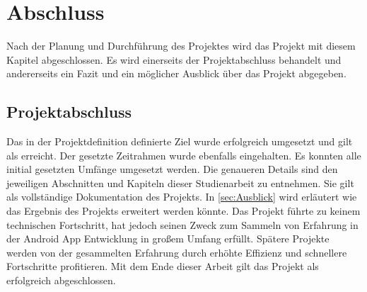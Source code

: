 \chapter{Abschluss}\label{chpt:schluss}
Nach der Planung und Durchführung des Projektes wird das Projekt mit diesem Kapitel abgeschlossen. Es wird einerseits der Projektabschluss behandelt und andererseits ein Fazit und ein möglicher Ausblick über das Projekt abgegeben.

\section{Projektabschluss}\label{sec:projektschluss}
Das in der Projektdefinition definierte Ziel wurde erfolgreich umgesetzt und gilt als erreicht. Der gesetzte Zeitrahmen wurde ebenfalls eingehalten. Es konnten alle initial gesetzten Umfänge umgesetzt werden. Die genaueren Details sind den jeweiligen Abschnitten und Kapiteln dieser Studienarbeit zu entnehmen. Sie gilt als vollständige Dokumentation des Projekts.
In \autoref{sec:Ausblick} wird erläutert wie das Ergebnis des Projekts erweitert werden könnte. Das Projekt führte zu keinem technischen Fortschritt, hat jedoch seinen Zweck zum Sammeln von Erfahrung in der Android App Entwicklung in großem Umfang erfüllt. Spätere Projekte werden von der gesammelten Erfahrung durch erhöhte Effizienz und schnellere Fortschritte profitieren. Mit dem Ende dieser Arbeit gilt das Projekt als erfolgreich abgeschlossen.

